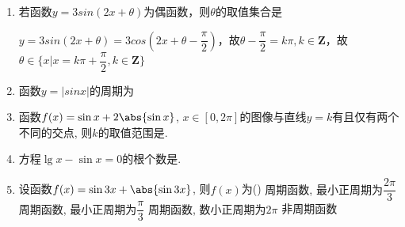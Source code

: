 \begin{enumerate}
\item 若函数$y = 3sin(2x+\theta)$为偶函数，则$\theta$的取值集合是
\begin{jieda}
    $y = 3sin(2x+\theta) = 3cos(2x+\theta-\dfrac{\pi}{2})$，故$\theta - \dfrac{\pi}{2} = k\pi, k\in \mathbf{Z}$，故$\theta \in \{x | x = k\pi + \dfrac{\pi}{2}, k \in \mathbf{Z} \}$
\end{jieda}
\item 函数$y = |sinx|$的周期为
\item 函数$f(x)=\sin{x}+2\abs{\sin{x}}$, $x\in[0,2\pi]$的图像与直线$y=k$有且仅有两个不同的交点, 则$k$的取值范围是. 

\item 方程$\lg{x}-\sin{x}=0$的根个数是. 



\item 设函数$f(x)=\sin3x+\abs{\sin3x}$, 则$f(x)$为\dotfill()
\xx
{周期函数, 最小正周期为$\dfrac{2\pi}{3}$}
{周期函数, 最小正周期为$\dfrac{\pi}{3}$}
{周期函数, 数小正周期为$2\pi$}
{非周期函数}


\end{enumerate}
